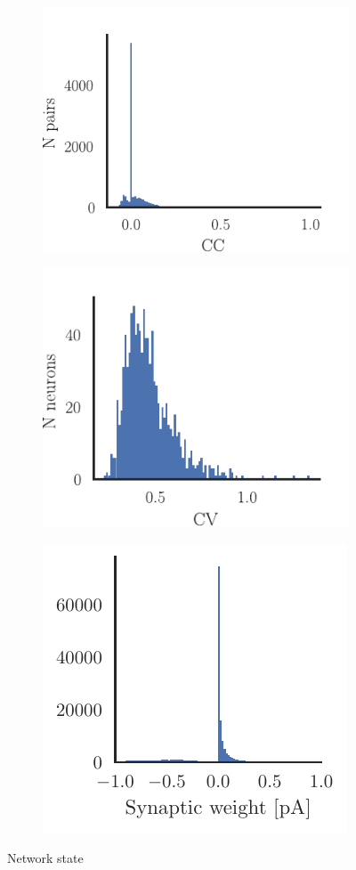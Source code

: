 \documentclass[11pt]{article}
\begin{document}
\begin{figure}
\makeatletter
\renewcommand\p@subfigure{}
\makeatother
\begin{subfigure}{0.5\textwidth} \includegraphics[scale=.9]{CC}
\caption{} \label{fig:CC}
\end{subfigure}
\begin{subfigure}{0.5\textwidth} \includegraphics[scale=.95]{CV}
\caption{} \label{fig:CV}
\end{subfigure}\medskip

\begin{subfigure}{\textwidth}\centering \includegraphics[scale=1]{syn_dist}
\caption{} \label{fig:syn_dist}
\end{subfigure}
\caption{Network state \label{fig:state}}
\end{figure}
\end{document}
